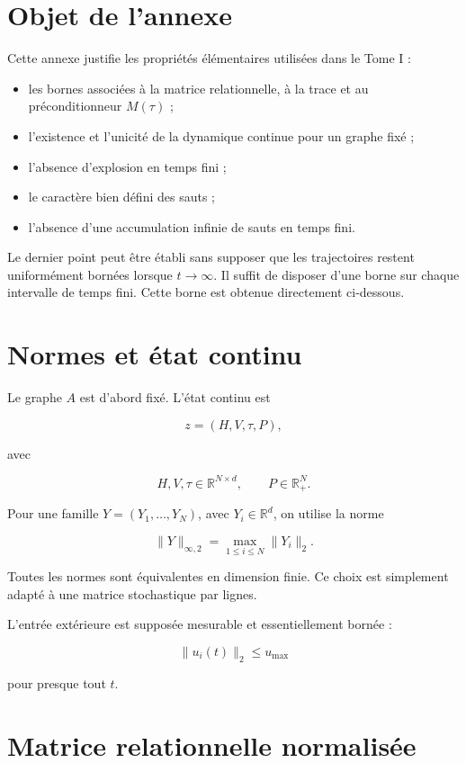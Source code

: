 \section{Objet de l'annexe}
\label{annexe-existence-objet}

Cette annexe justifie les propriétés élémentaires utilisées dans le
Tome I :

\begin{itemize}
\item
  les bornes associées à la matrice relationnelle, à la trace et au
  préconditionneur \(M(\tau)\) ;
\item
  l'existence et l'unicité de la dynamique continue pour un graphe
  fixé ;
\item
  l'absence d'explosion en temps fini ;
\item
  le caractère bien défini des sauts ;
\item
  l'absence d'une accumulation infinie de sauts en temps fini.
\end{itemize}

Le dernier point peut être établi sans supposer que les trajectoires
restent uniformément bornées lorsque \(t\to\infty\). Il suffit de
disposer d'une borne sur chaque intervalle de temps fini. Cette borne
est obtenue directement ci-dessous.

\section{Normes et état continu}
\label{annexe-existence-normes}

Le graphe \(A\) est d'abord fixé. L'état continu est

\[
z=(H,V,\tau,P),
\]

avec

\[
H,V,\tau\in\mathbb R^{N\times d},
\qquad
P\in\mathbb R_+^N.
\]

Pour une famille \(Y=(Y_1,\ldots,Y_N)\), avec
\(Y_i\in\mathbb R^d\), on utilise la norme

\[
\|Y\|_{\infty,2}
=
\max_{1\leq i\leq N}\|Y_i\|_2.
\]

Toutes les normes sont équivalentes en dimension finie. Ce choix est
simplement adapté à une matrice stochastique par lignes.

L'entrée extérieure est supposée mesurable et essentiellement bornée :

\[
\|u_i(t)\|_2\leq u_{\max}
\]

pour presque tout \(t\).

\section{Matrice relationnelle normalisée}
\label{annexe-existence-matrice-relationnelle}

